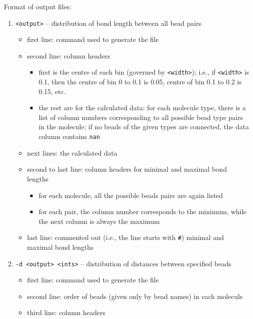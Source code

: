 \noindent
Format of output files:
\begin{enumerate}[nosep,leftmargin=20pt]
  \item \texttt{<output>} -- distribution of bond length between all bead
    pairs
    \begin{itemize}[nosep,leftmargin=5pt]
      \item first line: command used to generate the file
      \item second line: column headers
        \begin{itemize}[nosep,leftmargin=10pt]
          \item first is the centre of each bin (governed by
            \texttt{<width>}); i.e., if \texttt{<width>} is 0.1,
            then the centre of bin 0 to 0.1 is 0.05, centre of bin 0.1 to
            0.2 is 0.15, etc.
          \item the rest are for the calculated data: for each molecule type,
            there is a list of column numbers corresponding to all
            possible bead type pairs in the molecule; if no beads of the
            given types are connected, the data column contains \texttt{nan}
        \end{itemize}
      \item next lines: the calculated data
      \item second to last line: column headers for minimal and maximal bond
        lengths
        \begin{itemize}[nosep,leftmargin=10pt]
          \item for each molecule, all the possible beads pairs are again listed
          \item for each pair, the column number corresponds to the minimum,
            while the next column is always the maximum
        \end{itemize}
      \item last line: commented out (i.e., the line starts with \texttt{\#})
        minimal and maximal bond lengths
    \end{itemize}
  \item \texttt{-d <output> <ints>} -- distribution of distances between
    specified beads
    \begin{itemize}[nosep,leftmargin=5pt]
      \item first line: command used to generate the file
      \item second line: order of beads (given only by bead names) in each
        molecule
      \item third line: column headers

\end{itemize}
\end{enumerate}
